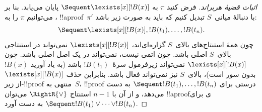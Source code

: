 \documentclass[../../../include/open-logic-section]{subfiles}
\begin{document}
\begin{proof}[اثبات قضیهٔ هربراند]
فرض کنید $\pi$ به $\Sequent \lexists[x][!B(x)]$ پایان می‌یابد. بنا بر
، می‌توانیم $\pi$ را به !!a{proof}~$\pi'$ با
دنبالهٔ میانی~$S$ تبدیل کنیم که باید به صورت زیر باشد:
\[
\Sequent \lexists[x][!B(x)], !B(t_1), \dots, !B(t_n).
\]
چون همهٔ استنتاج‌های بالای~$S$ گزاره‌ای‌اند،
$\lexists[x][!B(x)]$ نمی‌تواند در استنتاجی بالای~$S$ اصلی باشد. چون
اتمی نیست، نمی‌تواند در یک اصل اصلی باشد. چون
$\lexists[x][!B(x)]$ نمی‌تواند زیر‌فرمول سرهٔ~$!B(t_1)$ باشد
(به یاد آورید $!B(x)$ بدون سور است)، بالای~$S$ نیز نمی‌تواند فعال
باشد. بنابراین حذف $\lexists[x][!B(x)]$ از زیر-!!{proof} منتهی
به~$S$، !!{proof} درستی برای
$\Sequent !B(t_1), \dots, !B(t_n)$ به دست می‌دهد، و از آن با $n-1$
استنتاج $\RightR{\lor}$ می‌توان !!a{proof}ی برای
$\Sequent !B(t_1) \lor \dots \lor !B(t_n)$ به دست آورد.
\end{proof}

\end{document}
